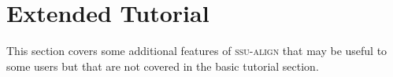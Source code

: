 \section{Extended Tutorial}

This section covers some additional features of \textsc{ssu-align}
that may be useful to some users but that are not covered in the basic
tutorial section. 












